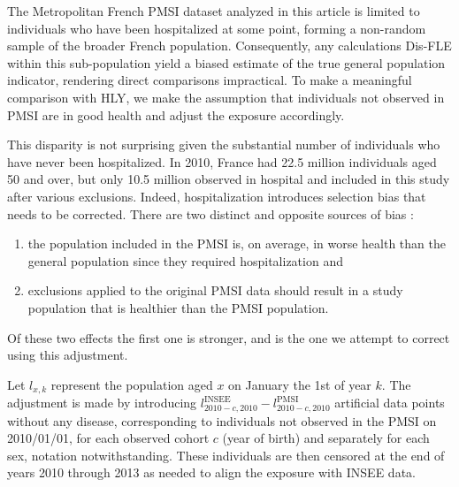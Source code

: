 \documentclass[risks,article,submit,moreauthors,pdftex]{Definitions/mdpi}
\providecommand{\tightlist}{%
  \setlength{\itemsep}{0pt}\setlength{\parskip}{0pt}}
\begin{document}
The Metropolitan French PMSI dataset analyzed in this article is limited
to individuals who have been hospitalized at some point, forming a
non-random sample of the broader French population. Consequently, any
calculations Dis-FLE within this sub-population yield a biased estimate
of the true general population indicator, rendering direct comparisons
impractical. To make a meaningful comparison with HLY, we make the
assumption that individuals not observed in PMSI are in good health and
adjust the exposure accordingly.

This disparity is not surprising given the substantial number of
individuals who have never been hospitalized. In 2010, France had 22.5
million individuals aged 50 and over\citep{insee_situation_2022}, but
only 10.5 million observed in hospital and included in this study after
various exclusions. Indeed, hospitalization introduces selection bias
that needs to be corrected. There are two distinct and opposite sources
of bias :

\begin{enumerate}
\def\labelenumi{\arabic{enumi}.}
\tightlist
\item
  the population included in the PMSI is, on average, in worse health
  than the general population since they required hospitalization and
\item
  exclusions applied to the original PMSI data should result in a study
  population that is healthier than the PMSI population.
\end{enumerate}

Of these two effects the first one is stronger, and is the one we
attempt to correct using this adjustment.

Let \(l_{x,k}\) represent the population aged \(x\) on January the 1st
of year \(k\). The adjustment is made by introducing
\(l_{2010-c,2010}^\text{INSEE} - l_{2010-c,2010}^\text{PMSI}\)
artificial data points without any disease, corresponding to individuals
not observed in the PMSI on 2010/01/01, for each observed cohort \(c\)
(year of birth) and separately for each sex, notation notwithstanding.
These individuals are then censored at the end of years 2010 through
2013 as needed to align the exposure with INSEE data.
\end{document}
